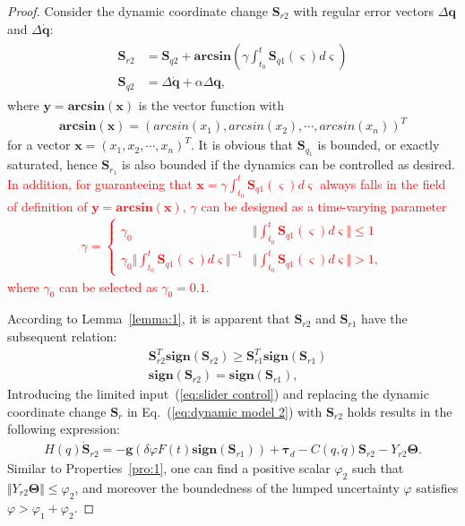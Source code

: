\documentclass[3p]{elsarticle}
\theoremstyle{plain}
\theoremstyle{remark}
\begin{document}
\begin{proof}
Consider the dynamic coordinate change $\bm S_{r2}$ with regular error vectors $\Delta \bm q$ and $\Delta\dot{\bm q}$:
\begin{align}
\begin{split}
\bm S_{r2} &= \bm S_{q2}+\bm{arcsin}(\gamma\int^t_{t_0}\bm S_{q1}(\varsigma) d\varsigma)\\
\bm S_{q2} &= \Delta \dot {\bm q}+\alpha \Delta \bm q,
\end{split}
\end{align}
where $\bm y=\bm{arcsin}(\bm x)$ is the vector function with
\begin{align}
\bm{arcsin}(\bm x) = \left(arcsin(x_1),arcsin(x_2),\cdots,arcsin(x_n)\right)^T
\end{align}
for a vector $\bm x=\left(x_1,x_2,\cdots,x_n\right)^T$. It is obvious that $\bm S_{q_1}$ is bounded, or exactly saturated, hence $\bm S_{r_1}$ is also bounded if the dynamics can be controlled as desired. \textcolor{red}{In addition, for guaranteeing that $\bm x=\gamma\int^t_{t_0}\bm S_{q1}(\varsigma) d\varsigma$ always falls in the field of definition of $\bm y=\bm{arcsin}(\bm x)$, $\gamma$ can be designed as a time-varying parameter
    \begin{align}
    \gamma=\begin{cases}
    \gamma_0&\Vert\int^t_{t_0}\bm S_{q1}(\varsigma) d\varsigma\Vert\le 1\\
    \gamma_0\Vert\int^t_{t_0}\bm S_{q1}(\varsigma) d\varsigma\Vert^{-1}&\Vert\int^t_{t_0}\bm S_{q1}(\varsigma) d\varsigma\Vert> 1,
    \end{cases}
    \end{align}
    where $\gamma_0$ can be selected as $\gamma_0=0.1$.}\par
According to Lemma~\ref{lemma:1}, it is apparent that $\bm S_{r2}$ and $\bm S_{r1}$ have the subsequent relation:
\begin{align}
&\bm S_{r2}^T \bm{sign}(\bm S_{r2}) \ge  \bm S_{r1}^T \bm{sign}(\bm S_{r1})\\
&\bm{sign}(\bm S_{r2})=\bm{sign}(\bm S_{r1}),
\end{align}
Introducing the limited input~(\ref{eq:slider control}) and replacing the dynamic coordinate change $\bm S_r$ in Eq.~(\ref{eq:dynamic model 2}) with $\bm S_{r2}$ holds results in the following expression:
\begin{align}
H(q)\dot {\bm S}_{r2} = -\bm{g}(\delta\varphi F(t) \bm{sign}(\bm S_{r1}))+\bm\tau_d-C(q,\dot q)\bm S_{r2}-Y_{r2}\bm\Theta.
\end{align}
Similar to Properties~\ref{pro:1}, one can find a positive scalar $\varphi_2$ such that $\Vert Y_{r2}\bm\Theta\Vert\le\varphi_2$, and moreover the boundedness of the lumped uncertainty $\varphi$ satisfies $\varphi>\varphi_1+\varphi_2$.


\end{proof}
\end{document}
